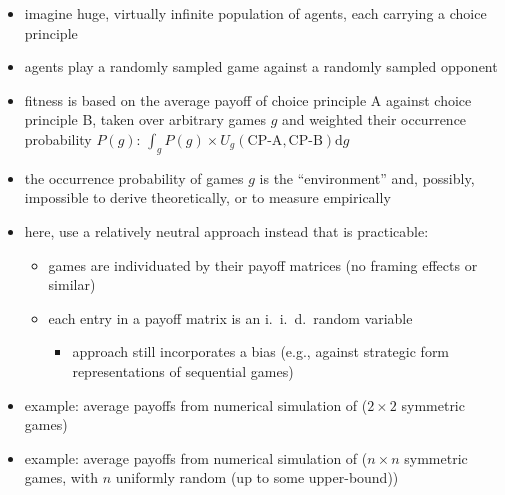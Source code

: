\documentclass[fleqn,reqno,11pt]{article}
\begin{document}
\begin{itemize}
\item imagine huge, virtually infinite population of agents, each carrying a choice principle
\item agents play a randomly sampled game against a randomly sampled opponent
\item fitness is based on the average payoff of choice principle A against choice principle B,
  taken over arbitrary games $g$ and weighted their occurrence probability $P(g)$:
  $\int_g P(g) \times U_g(\text{CP-A}, \text{CP-B}) \text{d}g$
\item the occurrence probability of games $g$ is the ``environment'' and, possibly, impossible to
  derive theoretically, or to measure empirically
\item here, use a relatively neutral approach instead that is practicable:
  \begin{itemize}
  \item games are individuated by their payoff matrices (no framing effects or similar)
  \item each entry in a payoff matrix is an i.~i.~d.~random variable
    \begin{itemize}
    \item approach still incorporates a bias (e.g., against strategic form representations of
      sequential games)
    \end{itemize}
  \end{itemize}
\item example: average payoffs from numerical simulation of ($2 \times 2$ symmetric games)
\item example: average payoffs from numerical simulation of ($n \times n$ symmetric games, with
  $n$ uniformly random (up to some upper-bound))
\end{itemize}
\end{document}
